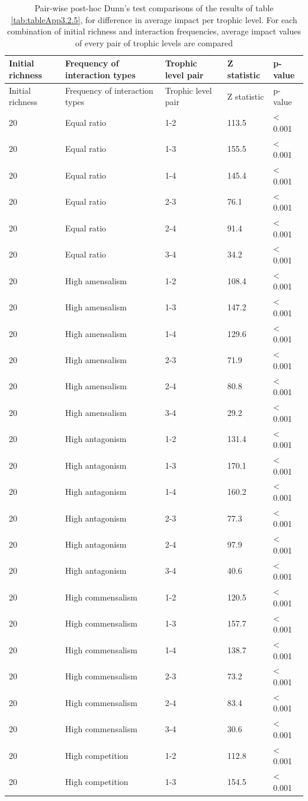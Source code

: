 \begin{longtable}[]{@{}lllll@{}}
\caption[Post-hoc tests of trophic-level impacts]{\color{Gray} Pair-wise post-hoc Dunn's test comparisons of the results of table \ref{tab:tableApp3.2.5}, for difference in average impact per trophic level. For each combination of initial richness and interaction frequencies, average impact values of every pair of trophic levels are compared}\label{tab:tableApp3.2.6}\\
\toprule
Initial richness & Frequency of interaction types & Trophic level pair & Z statistic & p-value\tabularnewline
\midrule
\endfirsthead
\toprule
Initial richness & Frequency of interaction types & Trophic level pair & Z statistic & p-value\tabularnewline
\midrule
\endhead

20 & Equal ratio & 1-2 & 113.5 & \textless{} 0.001\tabularnewline
20 & Equal ratio & 1-3 & 155.5 & \textless{} 0.001\tabularnewline
20 & Equal ratio & 1-4 & 145.4 & \textless{} 0.001\tabularnewline
20 & Equal ratio & 2-3 & 76.1 & \textless{} 0.001\tabularnewline
20 & Equal ratio & 2-4 & 91.4 & \textless{} 0.001\tabularnewline
20 & Equal ratio & 3-4 & 34.2 & \textless{} 0.001\tabularnewline
20 & High amensalism & 1-2 & 108.4 & \textless{} 0.001\tabularnewline
20 & High amensalism & 1-3 & 147.2 & \textless{} 0.001\tabularnewline
20 & High amensalism & 1-4 & 129.6 & \textless{} 0.001\tabularnewline
20 & High amensalism & 2-3 & 71.9 & \textless{} 0.001\tabularnewline
20 & High amensalism & 2-4 & 80.8 & \textless{} 0.001\tabularnewline
20 & High amensalism & 3-4 & 29.2 & \textless{} 0.001\tabularnewline
20 & High antagonism & 1-2 & 131.4 & \textless{} 0.001\tabularnewline
20 & High antagonism & 1-3 & 170.1 & \textless{} 0.001\tabularnewline
20 & High antagonism & 1-4 & 160.2 & \textless{} 0.001\tabularnewline
20 & High antagonism & 2-3 & 77.3 & \textless{} 0.001\tabularnewline
20 & High antagonism & 2-4 & 97.9 & \textless{} 0.001\tabularnewline
20 & High antagonism & 3-4 & 40.6 & \textless{} 0.001\tabularnewline
20 & High commensalism & 1-2 & 120.5 & \textless{} 0.001\tabularnewline
20 & High commensalism & 1-3 & 157.7 & \textless{} 0.001\tabularnewline
20 & High commensalism & 1-4 & 138.7 & \textless{} 0.001\tabularnewline
20 & High commensalism & 2-3 & 73.2 & \textless{} 0.001\tabularnewline
20 & High commensalism & 2-4 & 83.4 & \textless{} 0.001\tabularnewline
20 & High commensalism & 3-4 & 30.6 & \textless{} 0.001\tabularnewline
20 & High competition & 1-2 & 112.8 & \textless{} 0.001\tabularnewline
20 & High competition & 1-3 & 154.5 & \textless{} 0.001\tabularnewline

\end{longtable}
